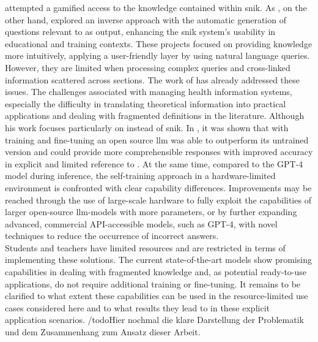 \citep{snikquiz} attempted a gamified access to the knowledge contained within \ac{snik}. 
As \citet{arneba}, on the other hand, explored an inverse approach with the automatic generation of questions relevant to \citep{snikquiz} as output, enhancing the \ac{snik} system's usability in educational and training contexts.
These projects focused on providing knowledge more intuitively, applying a user-friendly layer by using natural language queries.
%
However, they are limited when processing complex queries and cross-linked information scattered across sections.
The work of \citet{Paul_Keller} has already addressed these issues. 
The challenges associated with managing health information systems, especially the difficulty in translating theoretical information into practical applications and dealing with fragmented definitions in the literature.
Although his work focuses particularly on \citet{bb2} instead of \ac{snik}.
%
In \citet{Paul_Keller}, it was shown that with training and fine-tuning an open source \ac{llm} was able to outperform its untrained version and could provide more comprehensible responses with improved accuracy in explicit and limited reference to \citet{bb2}.
At the same time, compared to the GPT-4 model during inference, the self-training approach in a hardware-limited environment is confronted with clear capability differences.
%
Improvements may be reached through the use of large-scale hardware to fully exploit the capabilities of larger open-source \ac{llm}-models with more parameters, or by further expanding advanced, commercial API-accessible models, such as GPT-4, with novel techniques to reduce the occurrence of incorrect answers.\\
%
Students and teachers have limited resources and are restricted in terms of implementing these solutions.
The current state-of-the-art models show promising capabilities in dealing with fragmented knowledge and, as potential ready-to-use applications, do not require additional training or fine-tuning. 
It remains to be clarified to what extent these capabilities can be used in the resource-limited use cases considered here and to what results they lead to in these explicit application scenarios.
/todo{Hier nochmal die klare Darstellung der Problematik und dem Zusammenhang zum Ansatz dieser Arbeit.}


